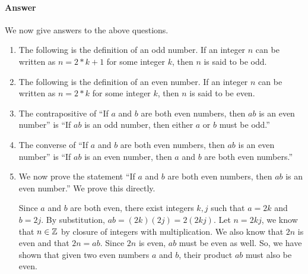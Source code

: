 \documentclass{article}
\begin{document}
\paragraph{Answer}


We now give answers to the above questions.

\begin{enumerate}
    \item The following is the definition of an odd number.
    If an integer $n$ can be written as $ n = 2*k + 1 $ for some integer $k$, then $n$ is said to be odd.
    \item The following is the definition of an even number.
    If an integer $n$ can be written as $ n = 2*k$ for some integer $k$, then $n$ is said to be even.
    \item The contrapositive of ``If $a$ and $b$ are both even numbers, then $ab$ is an even number'' is ``If $ab$ is an odd number, then either $a$ or $b$ must be odd.''
    \item The converse of ``If $a$ and $b$ are both even numbers, then $ab$ is an even number'' is ``If $ab$ is an even number, then $a$ and $b$ are both even numbers.''
    \item We now prove the statement ``If $a$ and $b$ are both even numbers, then $ab$ is an even number.''
    We prove this directly.

    Since $a$ and $b$ are both even, there exist integers $k,j$ such that $a = 2k$ and $b = 2j$.
    By substitution, $ab = (2k) (2j) = 2(2kj) $.
    Let $n = 2kj$, we know that $n \in {\mathbb Z}$ by closure of integers with multiplication.
    We also know that $2n$ is even and that $2n = ab$.
    Since $2n$ is even, $ab$ must be even as well.
    So, we have shown that given two even numbers $a$ and $b$, their product $ab$ must also be even.
\end{enumerate}


\end{document}
